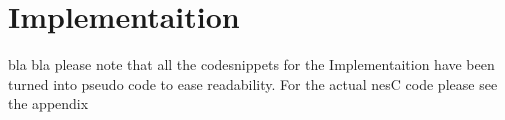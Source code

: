 \chapter{Implementaition}\label{ch:implementation}


bla bla please note that all the codesnippets for the Implementaition have been turned into pseudo code to ease readability. For the actual nesC code please see the appendix  








